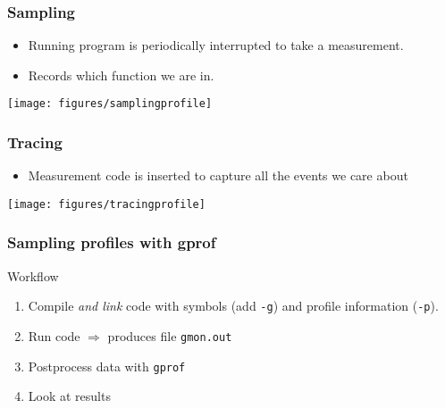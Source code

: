 \documentclass[dvipsnames,presentation,aspectratio=169,14pt]{beamer}
\begin{document}
\begin{frame}
  \frametitle{Sampling}
  \begin{itemize}
  \item Running program is periodically interrupted to take a measurement.
  \item Records which function we are in.
  \end{itemize}
  \begin{center}
    \texttt{[image: figures/samplingprofile]}
  \end{center}
\end{frame}
\begin{frame}
  \frametitle{Tracing}
  \begin{itemize}
  \item Measurement code is inserted to capture all the events we care
    about
  \end{itemize}
  \begin{center}
    \texttt{[image: figures/tracingprofile]}
  \end{center}
\end{frame}


\begin{frame}
  \frametitle{Sampling profiles with gprof}
  \begin{exampleblock}{Workflow}
    \begin{enumerate}
    \item Compile \emph{and link} code with symbols (add \texttt{-g}) and profile
      information (\texttt{-p}).
    \item Run code $\Rightarrow$ produces file \texttt{gmon.out}
    \item Postprocess data with \texttt{gprof}
    \item Look at results
    \end{enumerate}
  \end{exampleblock}
\end{frame}
\end{document}

